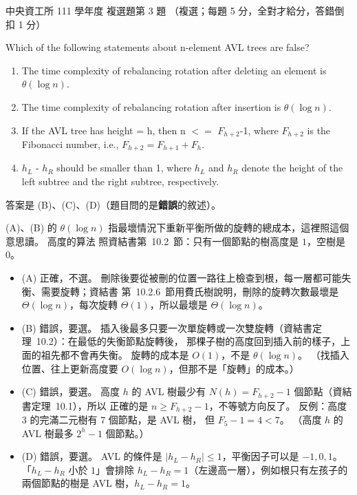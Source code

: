 \begin{pastexam}[label={px:ncu-111-dsa-03}]{中央資工所 111 學年度 複選題第 3 題}
（複選；每題 5 分，全對才給分，答錯倒扣 1 分）

Which of the following statements about n-element AVL trees are false?
\begin{enumerate}[label=(\Alph*)]
\item The time complexity of rebalancing rotation after deleting an element is $\theta(\log n)$.
\item The time complexity of rebalancing rotation after insertion is $\theta(\log n)$.
\item If the AVL tree has height = h, then n $<=$ $F_{h+2}$-1, where $F_{h+2}$ is the Fibonacci
number, i.e., $F_{h+2}=F_{h+1}+F_h$.
\item $h_L$ - $h_R$ should be smaller than 1, where $h_L$ and $h_R$ denote the height of the left
subtree and the right subtree, respectively.
\end{enumerate}
\end{pastexam}

\begin{pastsoln}
答案是 (B)、(C)、(D)（題目問的是\textbf{錯誤}的敘述）。

(A)、(B) 的 $\theta(\log n)$ 指最壞情況下重新平衡所做的旋轉的總成本，這裡照這個意思讀。 高度的算法
照資結書第~10.2~節：只有一個節點的樹高度是 $1$，空樹是 $0$。
\begin{itemize}
\item (A) 正確，不選。 刪除後要從被刪的位置一路往上檢查到根，每一層都可能失衡、需要旋轉；資結書
第~10.2.6~節用費氏樹說明，刪除的旋轉次數最壞是 $\Theta(\log n)$，每次旋轉 $\Theta(1)$，所以最壞是
$\Theta(\log n)$。
\item (B) 錯誤，要選。 插入後最多只要一次單旋轉或一次雙旋轉（資結書定理~10.2）：在最低的失衡節點旋轉後，
那棵子樹的高度回到插入前的樣子，上面的祖先都不會再失衡。 旋轉的成本是 $O(1)$，不是 $\theta(\log n)$。
（找插入位置、往上更新高度要 $O(\log n)$，但那不是「旋轉」的成本。）
\item (C) 錯誤，要選。 高度 $h$ 的 AVL 樹最少有 $N(h) = F_{h+2} - 1$ 個節點（資結書定理~10.1），所以
正確的是 $n \ge F_{h+2} - 1$，不等號方向反了。 反例：高度 $3$ 的完滿二元樹有 $7$ 個節點，是 AVL 樹，
但 $F_5 - 1 = 4 < 7$。 （高度 $h$ 的 AVL 樹最多 $2^h - 1$ 個節點。）
\item (D) 錯誤，要選。 AVL 的條件是 $|h_L - h_R| \le 1$，平衡因子可以是 $-1, 0, 1$。 「$h_L - h_R$ 小於
$1$」會排除 $h_L - h_R = 1$（左邊高一層），例如根只有左孩子的兩個節點的樹是 AVL 樹，$h_L - h_R = 1$。
\end{itemize}
\end{pastsoln}
